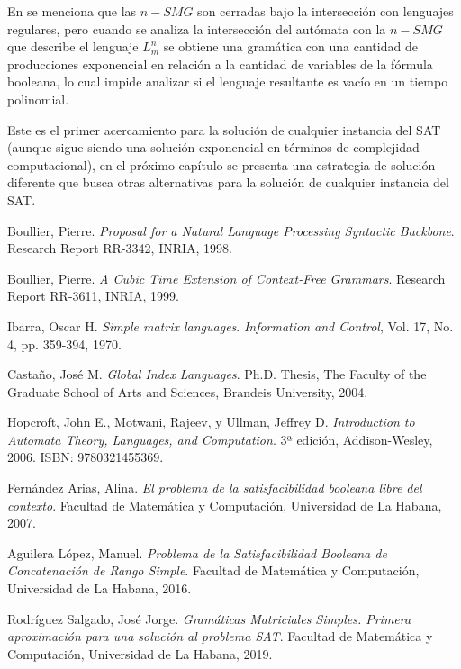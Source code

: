\documentclass[12pt]{article}
\begin{document}
En \cite{aSMSAT} se menciona que las $n-SMG$ son cerradas bajo la intersección con lenguajes regulares, 
pero cuando se analiza la intersección del autómata con la $n-SMG$ que describe el lenguaje $L^n_m$ se 
obtiene una gramática con una cantidad de producciones exponencial en relación a la cantidad de variables 
de la fórmula booleana, lo cual impide analizar si el lenguaje resultante es vacío en un tiempo polinomial.

Este es el primer acercamiento para la solución de cualquier instancia del SAT (aunque sigue siendo una solución exponencial
en términos de complejidad computacional), en el próximo capítulo se presenta una estrategia de solución diferente
que busca otras alternativas para la solución de cualquier instancia del SAT.

\begin{thebibliography}{99}
      
      Boullier, Pierre. 
      \textit{Proposal for a Natural Language Processing Syntactic Backbone}. 
      Research Report RR-3342, INRIA, 1998. 
      
      Boullier, Pierre. 
      \textit{A Cubic Time Extension of Context-Free Grammars}. 
      Research Report RR-3611, INRIA, 1999. 
      
      Ibarra, Oscar H. 
      \textit{Simple matrix languages}. 
      \textit{Information and Control}, Vol. 17, No. 4, pp. 359-394, 1970. 
      
      Castaño, José M. 
      \textit{Global Index Languages}. 
      Ph.D. Thesis, The Faculty of the Graduate School of Arts and Sciences, Brandeis University, 2004.
      
      Hopcroft, John E., Motwani, Rajeev, y Ullman, Jeffrey D. 
      \textit{Introduction to Automata Theory, Languages, and Computation}. 
      3ª edición, Addison-Wesley, 2006. ISBN: 9780321455369.
      
      Fernández Arias, Alina. 
      \textit{El problema de la satisfacibilidad booleana libre del contexto}. 
      Facultad de Matemática y Computación, Universidad de La Habana, 2007.
      
      Aguilera López, Manuel. 
      \textit{Problema de la Satisfacibilidad Booleana de Concatenación de Rango Simple}. 
      Facultad de Matemática y Computación, Universidad de La Habana, 2016.
      
      Rodríguez Salgado, José Jorge. 
      \textit{Gramáticas Matriciales Simples. Primera aproximación para una solución al problema SAT}. 
      Facultad de Matemática y Computación, Universidad de La Habana, 2019.
      
\end{thebibliography}
\end{document}
